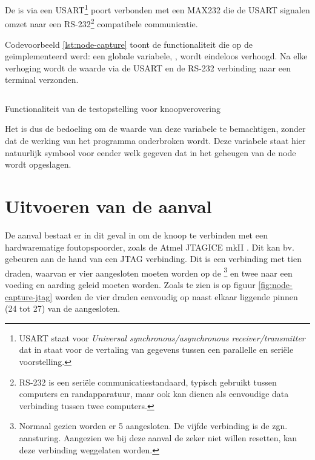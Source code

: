 De \mcu is via een USART\footnote{USART staat voor \emph{Universal
synchronous/asynchronous receiver/transmitter} dat in staat voor de vertaling
van gegevens tussen een parallelle en seri\"ele voorstelling.} poort verbonden
met een MAX232 \citep{datasheet:max232} die de USART signalen omzet naar een
RS-232\footnote{RS-232 is een seri\"ele communicatiestandaard, typisch gebruikt
tussen computers en randapparatuur, maar ook kan dienen als eenvoudige data
verbinding tussen twee computers.} compatibele communicatie.

Codevoorbeeld \ref{lst:node-capture} toont de functionaliteit die op de \mcu
ge\"implementeerd werd: een globale variabele, , wordt eindeloos
verhoogd. Na elke verhoging wordt de waarde via de USART en de RS-232
verbinding naar een terminal verzonden. 

\begin{listing}[ht]
  \inputminted[linenos,frame=lines,framesep=2mm,fontsize=\footnotesize]{c}{../src/node-capture/main.c}
  \vspace{-5mm}
  \caption{Functionaliteit van de testopstelling voor knoopverovering}
  \label{lst:node-capture}
\end{listing}

Het is dus de bedoeling om de waarde van deze  variabele te
bemachtigen, zonder dat de werking van het programma onderbroken wordt. Deze
variabele staat hier natuurlijk symbool voor eender welk gegeven dat in het
geheugen van de node wordt opgeslagen.

\vspace{-3mm}

\section{Uitvoeren van de aanval}

De aanval bestaat er in dit geval in om de knoop te verbinden met een
hardwarematige foutopspoorder, zoals de Atmel JTAGICE mkII
\citep{manual:jtagicemkii}. Dit kan bv. gebeuren aan de hand van een JTAG
verbinding. Dit is een verbinding met tien draden, waarvan er vier aangesloten
moeten worden op de \mcu\footnote{Normaal gezien worden er 5 aangesloten. De
vijfde verbinding is de zgn.  aansturing. Aangezien we bij deze
aanval de \mcu zeker niet willen resetten, kan deze verbinding weggelaten
worden.} en twee naar een voeding en aarding geleid moeten worden. Zoals te
zien is op figuur \ref{fig:node-capture-jtag} worden de vier draden eenvoudig
op naast elkaar liggende pinnen (24 tot 27) van de \mcu aangesloten.

